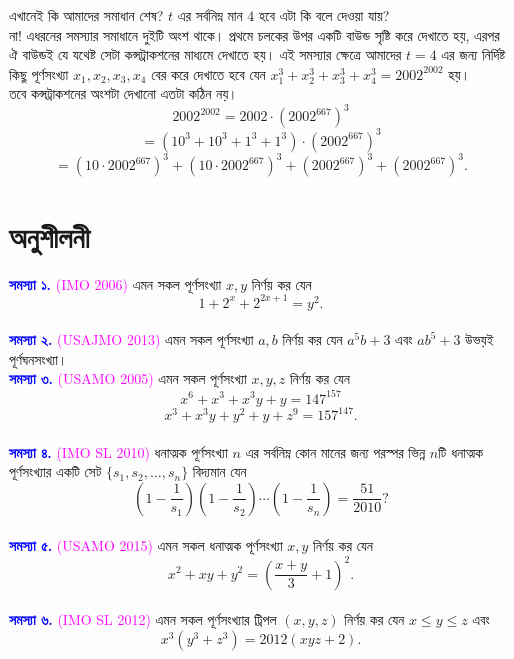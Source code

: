 \documentclass[11pt]{report}
\begin{document}
এখানেই কি আমাদের সমাধান শেষ? $t$ এর সর্বনিম্ন মান $4$ হবে এটা কি বলে দেওয়া যায়?\\

না! এধরনের সমস্যার সমাধানে দুইটি অংশ থাকে। প্রথমে চলকের উপর একটি বাউন্ড সৃষ্টি করে দেখাতে হয়, এরপর ঐ বাউন্ডই যে যথেষ্ট সেটা কন্সট্রাকশনের মাধ্যমে দেখাতে হয়। এই সমস্যার ক্ষেত্রে আমাদের $t=4$ এর জন্য নির্দিষ্ট কিছু পূর্ণসংখ্যা $x_1,x_2,x_3,x_4$ বের করে দেখাতে হবে যেন $x_1^3+x_2^3+x_3^3+x_4^3 = 2002^{2002}$ হয়।\\

তবে কন্সট্রাকশনের অংশটা দেখানো এতটা কঠিন নয়। $$2002^{2002} = 2002 \cdot (2002^{667})^3$$ $$= (10^3+10^3+1^3+1^3) \cdot (2002^{667})^3$$ $$= (10 \cdot 2002^{667})^3 + (10 \cdot 2002^{667})^3 + (2002^{667})^3 + (2002^{667})^3.$$

\newpage

\section{অনুশীলনী}

\begin{flushleft}

\textbf{\textcolor{blue}{সমস্যা ১.}} \textcolor{magenta}{(IMO 2006)} এমন সকল পূর্ণসংখ্যা $x,y$ নির্ণয় কর যেন $$1+2^x+2^{2x+1}=y^2.$$\\

\textbf{\textcolor{blue}{সমস্যা ২.}} \textcolor{magenta}{(USAJMO 2013)} এমন সকল পূর্ণসংখ্যা $a,b$ নির্ণয় কর যেন $a^5b+3$ এবং $ab^5+3$ উভয়ই পূর্ণঘনসংখ্যা।\\

\textbf{\textcolor{blue}{সমস্যা ৩.}} \textcolor{magenta}{(USAMO 2005)} এমন সকল পূর্ণসংখ্যা $x,y,z$ নির্ণয় কর যেন $$x^6+x^3+x^3y+y=147^{157}$$ $$x^3+x^3y+y^2+y+z^9=157^{147}.$$\\

\textbf{\textcolor{blue}{সমস্যা ৪.}} \textcolor{magenta}{(IMO SL 2010)} ধনাত্মক পূর্ণসংখ্যা $n$ এর সর্বনিম্ন কোন মানের জন্য পরস্পর ভিন্ন $n$টি ধনাত্মক পূর্ণসংখ্যার একটি সেট $\{s_1,s_2,\ldots,s_n\}$ বিদ্যমান যেন $$(1-\frac{1}{s_1})(1-\frac{1}{s_2}) \cdots (1-\frac{1}{s_n})= \frac{51}{2010} ?$$\\

\textbf{\textcolor{blue}{সমস্যা ৫.}} \textcolor{magenta}{(USAMO 2015)} এমন সকল ধনাত্মক পূর্ণসংখ্যা $x,y$ নির্ণয় কর যেন $$x^2+xy+y^2=(\frac{x+y}{3}+1)^2.$$\\

\textbf{\textcolor{blue}{সমস্যা ৬.}} \textcolor{magenta}{(IMO SL 2012)} এমন সকল পূর্ণসংখ্যার ট্রিপল $(x,y,z)$ নির্ণয় কর যেন $x \leq y \leq z$ এবং $$x^3(y^3+z^3)=2012(xyz+2).$$

\end{flushleft}
\end{document}
